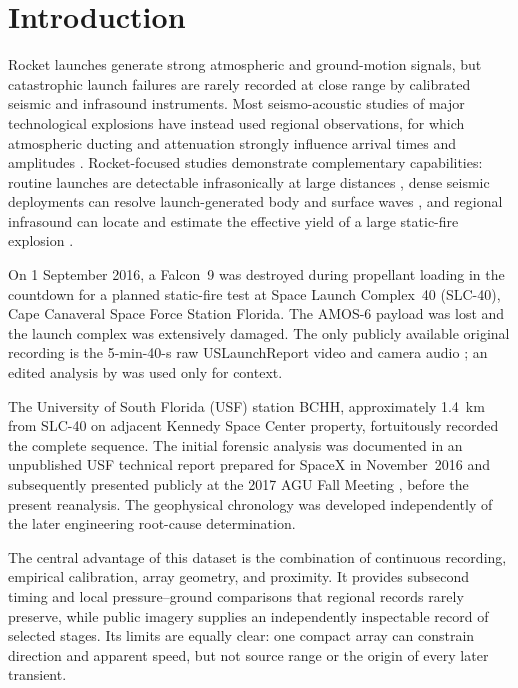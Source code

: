 \documentclass[]{seismica}
\begin{document}
\section{Introduction}
\label{sec:introduction}

Rocket launches generate strong atmospheric and ground-motion signals, but
catastrophic launch failures are rarely recorded at close range by calibrated
seismic and infrasound instruments. Most seismo-acoustic studies of major
technological explosions have instead used regional observations, for which
atmospheric ducting and attenuation strongly influence arrival times and
amplitudes \citep{ottemoller_2008,green_2008,ceranna_2009,smink_2019,
pilger_beirut_2021,kim_pasyanos_2022}. Rocket-focused studies demonstrate
complementary capabilities: routine launches are detectable infrasonically at
large distances \citep{pilger_rocket_2021}, dense seismic deployments can
resolve launch-generated body and surface waves
\citep{schuster_rocketquake_2025}, and regional infrasound can locate and
estimate the effective yield of a large static-fire explosion
\citep{silber_scamfer_newglenn_2026}.

On 1 September 2016, a Falcon~9 was destroyed during propellant loading in the
countdown for a planned static-fire test at Space Launch Complex~40 (SLC-40),
Cape Canaveral Space Force Station Florida. The AMOS-6 payload was lost and 
the launch complex was extensively damaged. The only publicly available original 
recording is the 5-min-40-s raw USLaunchReport video and camera audio 
\citep{uslaunchreport_amos6_video_2016}; an edited analysis by 
\citet{manley_spacex_explosion_2016} was used only for context. 

The University of South Florida (USF) station BCHH, approximately 1.4~km from
SLC-40 on adjacent Kennedy Space Center property, fortuitously recorded the
complete sequence. The initial forensic analysis was documented in an
unpublished USF technical report prepared for SpaceX in November~2016
\citep{thompson_mcnutt_fireball_2016} and subsequently presented publicly at
the 2017 AGU Fall Meeting \citep{thompson_agu_falcon9_2017}, before the
present reanalysis. The geophysical chronology was developed independently of
the later engineering root-cause determination.

The central advantage of this dataset is the combination of continuous
recording, empirical calibration, array geometry, and proximity. It provides
subsecond timing and local pressure--ground comparisons that regional records
rarely preserve, while public imagery supplies an independently inspectable
record of selected stages. Its limits are equally clear: one compact array can
constrain direction and apparent speed, but not source range or the origin of
every later transient.
\end{document}
